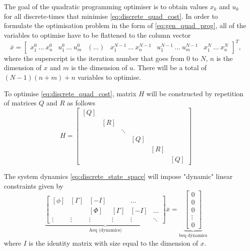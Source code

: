 \par The goal of the quadratic programming optimiser is to obtain values $x_k$ and $u_k$ for all discrete-times that minimise \ref{eq:discrete_quad_cost}. In order to formulate the optimisation problem in the form of \ref{eq:gen_quad_prog}, all of the variables to optimise have to be flattened to the column vector \begin{equation}
    \label{eq:quad_prog_xbar}
    \overline{x} = \begin{bmatrix} x^0_1\ \dots \ x^0_n & u_1^0\ \dots\ u_m^0 & (\dots) & x_1^{N-1}\ \dots\ x_n^{N-1} & u_1^{N-1}\ \dots\ u_m^{N-1} &  x_1^N\ \dots\ x_n^N \end{bmatrix} ^T,
\end{equation}
where the superscript is the iteration number that goes from 0 to $N$, $n$ is the dimension of $x$ and $m$ is the dimension of $u$. There will be a total of $(N-1)(n+m)+n$ variables to optimise.
\par To optimise \ref{eq:discrete_quad_cost}, matrix $H$ will be constructed by repetition of matrices $Q$ and $R$ as follows
\begin{equation}
    \label{eq:quad_prog_h}
    H = \begin{bmatrix}
        [Q] & & & & & \\
        & [R] & & & &  \\
        & & \ddots & & & \\
        & & & [Q] & & \\
        & & & & [R] & \\
        & & & & & [Q]
    \end{bmatrix}
\end{equation}

\par The system dynamics \ref{eq:discrete_state_space} will impose "dynamic" linear constraints given by
\begin{equation}
    \label{eq:quad_prog_Aeq_dyn}
    \underbrace{\begin{bmatrix}
        [\phi] & \left[\Gamma\right] & \left[ -I \right] & & \ldots \\
        & & [\Phi] & [\Gamma] & \left[ -I \right] & \ldots \\
        \vdots & \vdots & \vdots & \vdots & \vdots & \ddots 
    \end{bmatrix}}_\text{Aeq (dynamics)}
    \overline{x} = \underbrace{\begin{bmatrix} 0 \\ 0 \\ 0 \\ \vdots \\ 0 \end{bmatrix}}_\text{beq dynamics}
\end{equation}
where $I$ is the identity matrix with size equal to the dimension of $x$.

